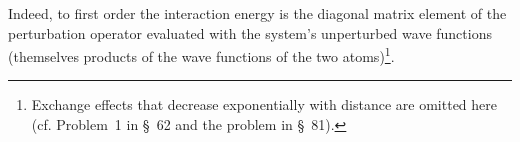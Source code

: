 Indeed, to first order the interaction energy is the diagonal matrix element of the perturbation operator evaluated with the system's unperturbed wave functions (themselves products of the wave functions of the two atoms)\footnote{Exchange effects that decrease exponentially with distance are omitted here (cf. Problem~1 in \S~62 and the problem in \S~81).}.
